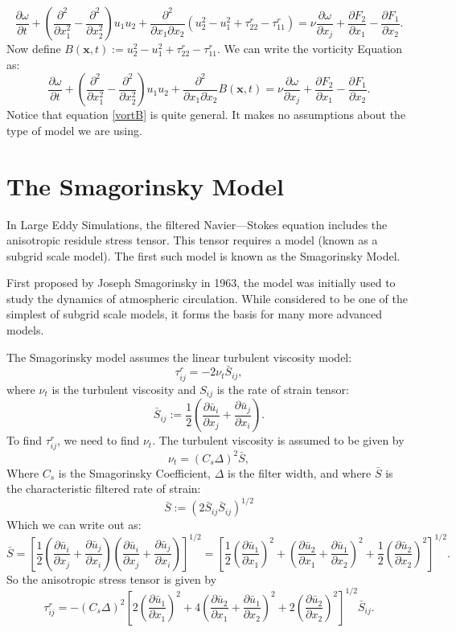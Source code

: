 \documentclass[11pt,a4paper]{article}
\begin{document}
$$\frac{\partial \omega}{\partial t}  + \left(\frac{\partial^2}{\partial x_1^2} - \frac{\partial^2}{\partial x_2^2}\right)u_1u_2 +\frac{\partial^2}{\partial x_1\partial x_2}\left(u_2^2-u_1^2 + \tau_{22}^r-  \tau_{11}^r\right)= \nu \frac{\partial \omega}{\partial x_j}+\frac{\partial F_2}{\partial x_1} - \frac{\partial F_1}{\partial x_2}.$$
Now define $B(\boldsymbol{x}, t) :=u_2^2-u_1^2+ \tau_{22}^r - \tau_{11}^r$. We can write the vorticity Equation as:
\begin{equation}\label{vortB}
\frac{\partial \omega}{\partial t}  + \left(\frac{\partial^2}{\partial x_1^2} - \frac{\partial^2}{\partial x_2^2}\right)u_1u_2 + \frac{\partial^2 }{\partial x_1\partial x_2}B(\boldsymbol{x}, t)= \nu \frac{\partial \omega}{\partial x_j}+\frac{\partial F_2}{\partial x_1} - \frac{\partial F_1}{\partial x_2} .
\end{equation}
Notice that equation \ref{vortB} is quite general. It makes no assumptions about the type of model we are using. 
\section{The Smagorinsky Model}
In Large Eddy Simulations, the filtered Navier—Stokes equation includes the anisotropic residule stress tensor. This tensor requires a model (known as a subgrid scale model). The first such model is known as the Smagorinsky Model.

First proposed by Joseph Smagorinsky in 1963, the model was initially used to study the dynamics of atmospheric circulation. While considered to be one of the simplest of subgrid scale models, it forms the basis for many more advanced  models. 

The Smagorinsky model assumes the linear turbulent viscosity model:
$$\tau_{ij}^r = -2\nu_t \bar{S}_{ij},$$
where $\nu_t$ is the turbulent viscosity and $S_{ij}$ is the rate of strain tensor:
$$\bar{S}_{ij} := \frac{1}{2}\left( \frac{\partial \bar{u}_i}{\partial x_j} + \frac{\partial \bar{u}_j}{\partial x_i}\right).$$
To find $\tau_{ij}^r$, we need to find $\nu_t$. The turbulent viscosity is assumed to be given by
$$\nu_t = (C_s \Delta)^2 \bar{S},$$
Where $C_s$ is the Smagorinsky Coefficient, $\Delta$ is the filter width, and where $\bar{S}$ is the characteristic filtered rate of strain:
$$\bar{S} := \left(2\bar{S}_{ij}\bar{S}_{ij}\right)^{1/2}$$
Which we can write out as:
$$\bar{S} = \left[\frac{1}{2}\left( \frac{\partial \bar{u}_i}{\partial x_j} + \frac{\partial \bar{u}_j}{\partial x_i}\right)\left( \frac{\partial \bar{u}_i}{\partial x_j} + \frac{\partial \bar{u}_j}{\partial x_i}\right)\right]^{1/2} = \left[\frac{1}{2}\left( \frac{\partial \bar{u}_1}{\partial x_1}\right)^2+\left( \frac{\partial \bar{u}_2}{\partial x_1} + \frac{\partial \bar{u}_1}{\partial x_2}\right)^2+\frac{1}{2}\left( \frac{\partial \bar{u}_2}{\partial x_2}\right)^2 \right]^{1/2}.$$
So the anisotropic stress tensor is given by
\begin{equation}\label{smagTau}
\tau_{ij}^r = -(C_s \Delta)^2\left[2\left( \frac{\partial \bar{u}_1}{\partial x_1}\right)^2+4\left( \frac{\partial \bar{u}_2}{\partial x_1} + \frac{\partial \bar{u}_1}{\partial x_2}\right)^2+2\left( \frac{\partial \bar{u}_2}{\partial x_2}\right)^2 \right]^{1/2}\bar{S}_{ij}.
\end{equation}
\end{document}
